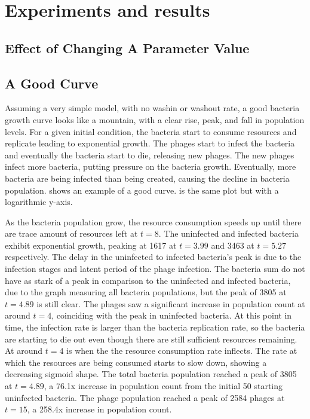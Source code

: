 \chapter{Experiments and results}
\label{AER}

\section{Effect of Changing A Parameter Value}



\section{A Good Curve}
Assuming a very simple model, with no washin or washout rate, a good bacteria growth curve looks like a mountain, with a clear rise, peak, and fall in population levels. 
For a given initial condition, the bacteria start to consume resources and replicate leading to exponential growth. 
The phages start to infect the bacteria and eventually the bacteria start to die, releasing new phages. 
The new phages infect more bacteria, putting pressure on the bacteria growth. 
Eventually, more bacteria are being infected than being created, causing the decline in bacteria population. 
 shows an example of a good curve. 
 is the same plot but with a logarithmic y-axis. 

As the bacteria population grow, the resource consumption speeds up until there are trace amount of resources left at $t=8$. 
The uninfected and infected bacteria exhibit exponential growth, peaking at 1617 at $t=3.99$ and 3463 at $t=5.27$ respectively. 
The delay in the uninfected to infected bacteria's peak is due to the infection stages and latent period of the phage infection. 
The bacteria sum do not have as stark of a peak in comparison to the uninfected and infected bacteria, due to the graph measuring all bacteria populations, but the peak of 3805 at $t=4.89$ is still clear. 
The phages saw a significant increase in population count at around $t=4$, coinciding with the peak in uninfected bacteria. 
At this point in time, the infection rate is larger than the bacteria replication rate, so the bacteria are starting to die out even though there are still sufficient resources remaining. 
At around $t=4$ is when the the resource consumption rate inflects. 
The rate at which the resources are being consumed starts to slow down, showing a decreasing sigmoid shape. 
The total bacteria population reached a peak of 3805 at $t=4.89$, a 76.1x increase in population count from the initial 50 starting uninfected bacteria. 
The phage population reached a peak of 2584 phages at $t=15$, a 258.4x increase in population count. 

